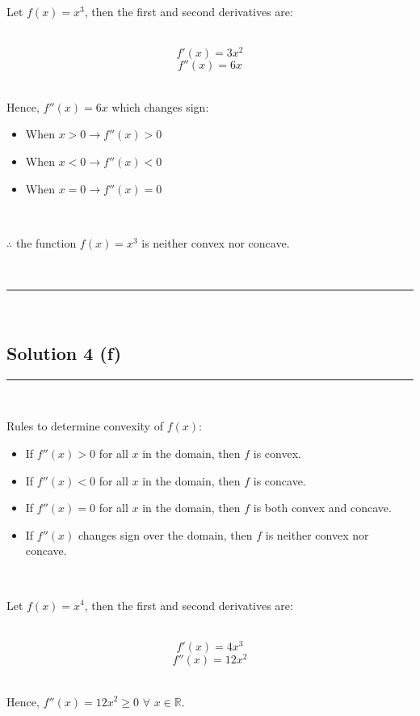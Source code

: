 \documentclass{article}
\begin{document}
\parbox{\textwidth}{
Let $f(x) = x^3$, then the first and second derivatives are:
}\\

$$f'(x) = 3x^2$$
$$f''(x) = 6x$$\\

\parbox{\textwidth}{
Hence, $f''(x) = 6x$ which changes sign:
\begin{itemize}
    \item When $x > 0 \rightarrow f''(x) > 0$
    \item When $x < 0 \rightarrow f''(x) < 0$
    \item When $x = 0 \rightarrow f''(x) = 0$
\end{itemize}
}\\

\parbox{\textwidth}{
$\therefore$ the function $f(x) = x^3$ is neither convex nor concave.
}\\

\noindent\rule{\textwidth}{0.4pt}\\

\newpage

\subsection*{Solution 4 (f)}
\noindent\rule{\textwidth}{0.4pt}\\

\parbox{\textwidth}{
Rules to determine convexity of $f(x)$:
\begin{itemize}
    \item If $f''(x) > 0$ for all $x$ in the domain, then $f$ is convex.
    \item If $f''(x) < 0$ for all $x$ in the domain, then $f$ is concave.
    \item If $f''(x) = 0$ for all $x$ in the domain, then $f$ is both convex and concave.
    \item If $f''(x)$ changes sign over the domain, then $f$ is neither convex nor concave.
\end{itemize}
}\\

\parbox{\textwidth}{
Let $f(x) = x^4$, then the first and second derivatives are:
}\\

$$f'(x) = 4x^3$$
$$f''(x) = 12x^2$$\\

\parbox{\textwidth}{
Hence, $f''(x) = 12x^2 \geq 0$ $\forall$ $x \in \mathbb{R}$.
}\\
\end{document}
